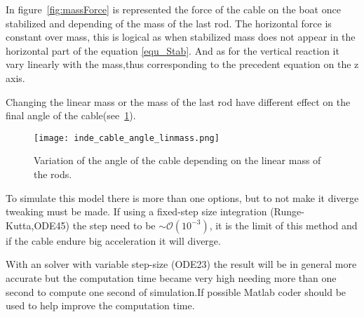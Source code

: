 In figure~\ref{fig:massForce} is represented the force of the cable on the boat once stabilized and depending of the mass of the last rod. The horizontal force is constant over mass, this is logical as when stabilized mass does not appear in the horizontal part of the equation \eqref{equ_Stab}. And as for the vertical reaction it vary linearly with the mass,thus corresponding to the precedent equation on the z axis.

Changing the linear mass or the mass of the last rod have different effect on the final angle of the cable(see~\ref{fig:linmassAngle}).

\begin{figure}[H]
\centering
    \texttt{[image: inde\_cable\_angle\_linmass.png]}
    \caption{Variation of the angle of the cable depending on the linear mass of the rods.}
    \label{fig:linmassAngle}
\end{figure}

To simulate this model there is more than one options, but to not make it diverge tweaking must be made.
If using a fixed-step size integration (Runge-Kutta,ODE45) the step need to be $\sim\mathcal{O}(10^{-3})$, it is the limit of this method and if the cable endure big acceleration it will diverge.

With an solver with variable step-size (ODE23) the result will be in general more accurate but the computation time became very high needing more than one second to compute one second of simulation.If possible Matlab coder should be used to help improve the computation time.
